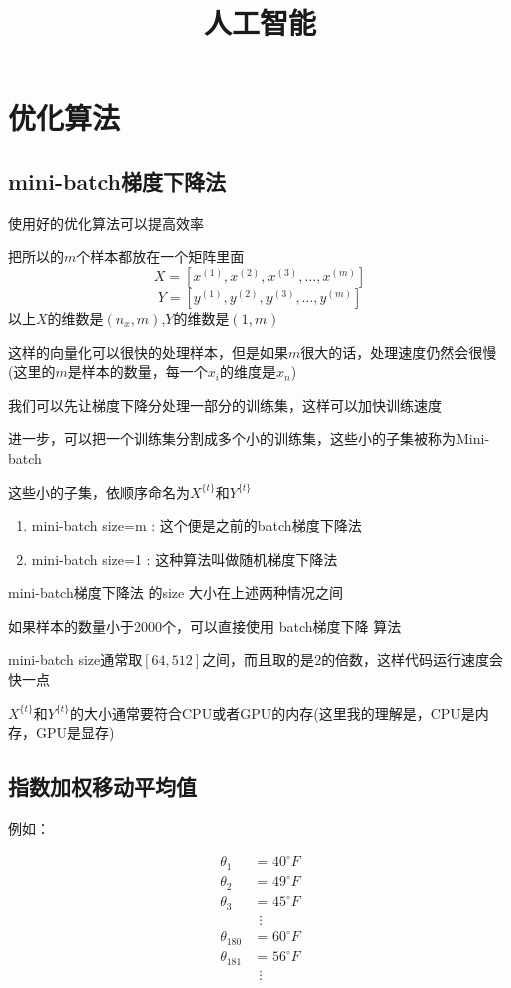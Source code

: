 \documentclass[UTF8]{ctexrep}
\title{人工智能}
\author{}
\date{}
\begin{document}
\maketitle
\tableofcontents
\newpage

\chapter{优化算法}
\section{mini-batch梯度下降法}
使用好的优化算法可以提高效率

把所以的$m$个样本都放在一个矩阵里面
$$X=[x^{(1)},x^{(2)},x^{(3)},\dots,x^{(m)}]$$
$$Y=[y^{(1)},y^{(2)},y^{(3)},\dots,y^{(m)}]$$
以上$X$的维数是$(n_x,m)$,$Y$的维数是$(1,m)$

这样的向量化可以很快的处理样本，但是如果$m$很大的话，处理速度仍然会很慢
(这里的$m$是样本的数量，每一个$x_i$的维度是$x_n$)

我们可以先让梯度下降分处理一部分的训练集，这样可以加快训练速度

进一步，可以把一个训练集分割成多个小的训练集，这些小的子集被称为Mini-batch 

这些小的子集，依顺序命名为$X^{\{t\}}$和$Y^{\{t\}}$

\begin{enumerate}
    \item mini-batch size=m : 这个便是之前的batch梯度下降法\\
    \item mini-batch size=1 : 这种算法叫做随机梯度下降法
\end{enumerate}
mini-batch梯度下降法 的size 大小在上述两种情况之间

如果样本的数量小于2000个，可以直接使用 batch梯度下降 算法

mini-batch size通常取$[64,512]$之间，而且取的是$2$的倍数，这样代码运行速度会快一点

$X^{\{t\}}$和$Y^{\{t\}}$的大小通常要符合CPU或者GPU的内存(这里我的理解是，CPU是内存，GPU是显存)


\section{指数加权移动平均值}
例如：

\begin{align*}
    \theta_1&=40^\circ F\\
    \theta_2&=49^\circ F\\
    \theta_3&=45^\circ F\\
    &\ \ \vdots\\
    \theta_{180}&=60^\circ F\\
    \theta_{181}&=56^\circ F\\
    &\ \ \vdots\\
\end{align*}
\end{document}
